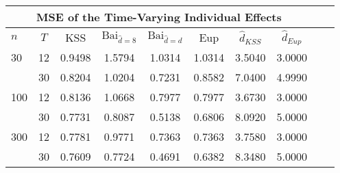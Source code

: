 \begin{tabular}{lccccccccc} 
\hline \multicolumn{8}{c}{MSE of the Time-Varying Individual Effects} \\ \hline 
$n$ & $T$ & KSS & $ \text{Bai}_{\hat{d} = 8}$ & $\text{Bai}_{\hat{d} = d}$ & Eup & $\hat{d}_{KSS}$ & $\hat{d}_{Eup}$ \\
\hline
30 & 12 &  0.9498  &  1.5794  &  1.0314  &  1.0314  &  3.5040  &  3.0000  \\
& 30 &  0.8204  &  1.0204  &  0.7231  &  0.8582  &  7.0400  &  4.9990  \\
100 & 12 &  0.8136  &  1.0668  &  0.7977  &  0.7977  &  3.6730  &  3.0000  \\
& 30 &  0.7731  &  0.8087  &  0.5138  &  0.6806  &  8.0920  &  5.0000  \\
300 & 12 &  0.7781  &  0.9771  &  0.7363  &  0.7363  &  3.7580  &  3.0000  \\
& 30 &  0.7609  &  0.7724  &  0.4691  &  0.6382  &  8.3480  &  5.0000  \\
\end{tabular} 
